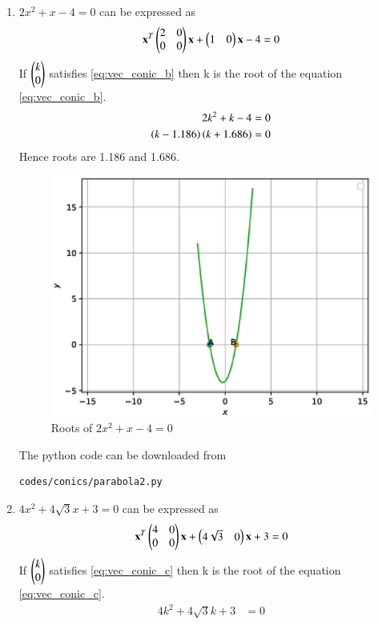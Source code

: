 \begin{enumerate}[label=\thesection.\arabic*.,ref=\thesection.\theenumi]
\begin{enumerate}
\item 
$2x^2 + x -4 = 0$ can be expressed as 
\begin{align}
\label{eq:vec_conic_b}
\mathbf{x}^T \begin{pmatrix}2 & 0\\0 & 0\end{pmatrix}\mathbf{x}+ \begin{pmatrix}1 & 0\end{pmatrix}\mathbf{x} -4=0
\end{align}
If $\begin{pmatrix}k\\0\end{pmatrix}$ satisfies \ref{eq:vec_conic_b} then k is the root of the equation \eqref{eq:vec_conic_b}.
\begin{align}
2k^{2}+k-4&=0
\\
\left(k-1.186\right)\left(k+1.686\right)&=0
\end{align}
Hence roots are 1.186 and 1.686.
\begin{figure}[!ht]
\centering
\includegraphics[width= \columnwidth]{./figs/conics/parabola2.eps}
\caption{Roots of $2x^2 + x -4 = 0$ }
\end{figure}
The python code can be downloaded from
\begin{lstlisting}
codes/conics/parabola2.py
\end{lstlisting}
\item 
$4x^2 + 4\sqrt{3}x + 3 = 0$ can be expressed as 
\begin{align}
\label{eq:vec_conic_c}
\mathbf{x}^T \begin{pmatrix}4 & 0\\0 & 0\end{pmatrix}\mathbf{x}+ \begin{pmatrix}4\sqrt{3} & 0\end{pmatrix}\mathbf{x}+3=0
\end{align}
If $\begin{pmatrix}k\\0\end{pmatrix}$ satisfies \ref{eq:vec_conic_c} then k is the root of the equation \eqref{eq:vec_conic_c}.
\begin{align}
4k^{2}+4\sqrt{3}k+3&=0 \\

\end{align}
\end{enumerate}
\end{enumerate}
